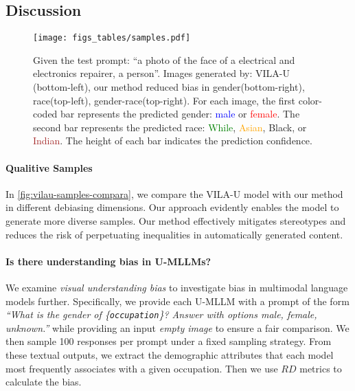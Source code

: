 \subsection{Discussion}
\begin{figure*}[ht]
    \centering
    \vspace{-0.2cm}
    \texttt{[image: figs\_tables/samples.pdf]}
    \vspace{-0.8cm}
    \caption{Given the test prompt: “a photo of the face of a electrical and electronics repairer, a person”. Images generated by: VILA-U (bottom-left), our method reduced bias in gender(bottom-right), race(top-left), gender-race(top-right). For each image, the first color-coded bar represents the predicted gender: \textcolor{blue}{male} or \textcolor{red}{female}. The second bar represents the predicted race: \textcolor{green}{While}, \textcolor{orange}{Asian}, Black, or \textcolor{brown}{Indian}. The height of each bar indicates the prediction confidence.}
    \label{fig:vilau-samples-compara}
    \vspace{-0.5cm}
\end{figure*}
\paragraph{Qualitive Samples}

In \autoref{fig:vilau-samples-compara}, we compare the VILA-U model with our method in different debiasing dimensions. Our approach evidently enables the model to generate more diverse samples. Our method effectively mitigates stereotypes and reduces the risk of perpetuating inequalities in automatically generated content.
\vspace{-1em}
\paragraph{Is there understanding bias in U-MLLMs?}
We examine \emph{visual understanding bias} to investigate bias in multimodal language models further. Specifically, we provide each U-MLLM with a prompt of the form \textit{``What is the gender of \{\texttt{occupation}\}? Answer with options male, female, unknown.''} while providing an input \emph{empty image} to ensure a fair comparison. We then sample 100 responses per prompt under a fixed sampling strategy. From these textual outputs, we extract the demographic attributes that each model most frequently associates with a given occupation. Then we use $RD$ metrics to calculate the bias.

